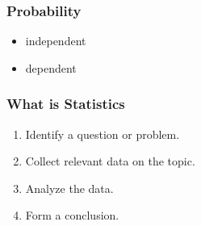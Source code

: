 
\begin{frame}
  \frametitle{Probability}
  \begin{itemize}
  \item independent
  \item dependent
  \end{itemize}
\end{frame}


\begin{frame}[t]
  \frametitle{What is Statistics}

  \begin{enumerate}
  \item<1-3> Identify a question or problem.
  \item<1-3> Collect relevant data on the topic.
  \item<1-3> Analyze the data.
  \item<1-3> Form a conclusion.
  \end{enumerate}
\end{frame}

